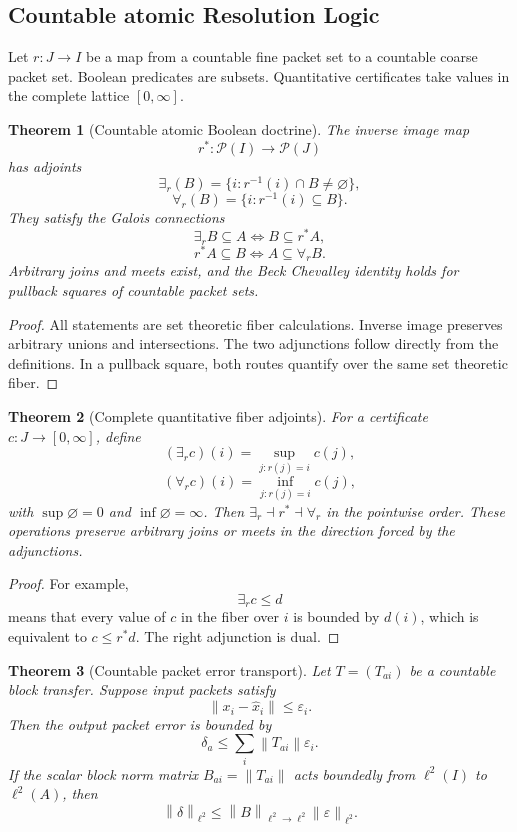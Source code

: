 \documentclass{aomart}
\newtheorem{theorem}{Theorem}[section]
\theoremstyle{definition}
\theoremstyle{remark}
\newcommand{\Pcal}{\mathcal P}
\newcommand{\norm}[1]{\left\lVert#1\right\rVert}
\begin{document}
\subsection{Countable atomic Resolution Logic}

Let \(r:J\to I\) be a map from a countable fine packet set to a countable coarse packet set. Boolean predicates are subsets. Quantitative certificates take values in the complete lattice \([0,\infty]\).

\begin{theorem}[Countable atomic Boolean doctrine]\label{thm:countable_boolean_doctrine}
The inverse image map
\[
 r^*:\Pcal(I)\to\Pcal(J)
\]
has adjoints
\[
 \exists_r(B)
 =
 \{i:r^{-1}(i)\cap B\ne\varnothing\},
\]
\[
 \forall_r(B)
 =
 \{i:r^{-1}(i)\subseteq B\}.
\]
They satisfy the Galois connections
\[
 \exists_rB\subseteq A
 \Longleftrightarrow
 B\subseteq r^*A,
\]
\[
 r^*A\subseteq B
 \Longleftrightarrow
 A\subseteq\forall_rB.
\]
Arbitrary joins and meets exist, and the Beck Chevalley identity holds for pullback squares of countable packet sets.
\end{theorem}

\begin{proof}
All statements are set theoretic fiber calculations. Inverse image preserves arbitrary unions and intersections. The two adjunctions follow directly from the definitions. In a pullback square, both routes quantify over the same set theoretic fiber.
\end{proof}

\begin{theorem}[Complete quantitative fiber adjoints]\label{thm:quantitative_fiber_adjoints}
For a certificate \(c:J\to[0,\infty]\), define
\[
 (\exists_rc)(i)
 =
 \sup_{j:r(j)=i}c(j),
\]
\[
 (\forall_rc)(i)
 =
 \inf_{j:r(j)=i}c(j),
\]
with \(\sup\varnothing=0\) and \(\inf\varnothing=\infty\). Then \(\exists_r\dashv r^*\dashv\forall_r\) in the pointwise order. These operations preserve arbitrary joins or meets in the direction forced by the adjunctions.
\end{theorem}

\begin{proof}
For example,
\[
 \exists_rc\leq d
\]
means that every value of \(c\) in the fiber over \(i\) is bounded by \(d(i)\), which is equivalent to \(c\leq r^*d\). The right adjunction is dual.
\end{proof}

\begin{theorem}[Countable packet error transport]\label{thm:countable_error_transport}
Let \(T=(T_{ai})\) be a countable block transfer. Suppose input packets satisfy
\[
 \norm{x_i-\widehat x_i}\leq\varepsilon_i.
\]
Then the output packet error is bounded by
\[
 \boxed{
 \delta_a
 \leq
 \sum_i\norm{T_{ai}}\varepsilon_i.
 }
\]
If the scalar block norm matrix \(B_{ai}=\norm{T_{ai}}\) acts boundedly from \(\ell^2(I)\) to \(\ell^2(A)\), then
\[
 \boxed{
 \norm\delta_{\ell^2}
 \leq
 \norm B_{\ell^2\to\ell^2}
 \norm\varepsilon_{\ell^2}.
 }
\]
\end{theorem}
\end{document}
